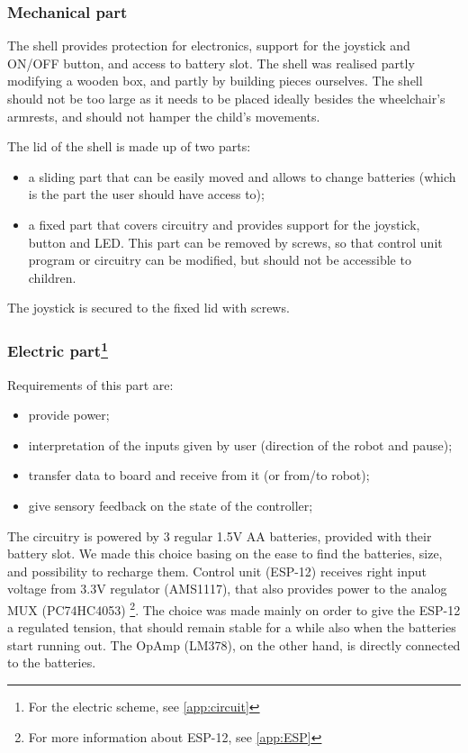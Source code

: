 \documentclass[a4paper,twoside]{book}
\begin{document}
\subsubsection{Mechanical part}

The shell provides protection for electronics, support for the joystick and ON/OFF button, and access to battery slot. The shell was realised partly modifying a wooden box, and partly by building pieces ourselves. The shell should not be too large as it needs to be placed ideally besides the wheelchair's armrests, and should not hamper the child's movements.

\beforelist The lid of the shell is made up of two parts:
\begin{itemize}
\item a sliding part that can be easily moved and allows to change batteries (which is the part the user should have access to);
\item a fixed part that covers circuitry and provides support for the joystick, button and LED. This part can be removed by screws, so that control unit program or circuitry can be modified, but should not be accessible to children.
\end{itemize}
\afterlist
The joystick is secured to the fixed lid with screws.

\subsubsection[Electric part]{Electric part\footnote{For the electric scheme, see \autoref{app:circuit}}}
\beforelist Requirements of this part are: 
\begin{itemize}
\item provide power;
\item interpretation of the inputs given by user (direction of the robot and pause);
\item transfer data to board and receive from it (or from/to robot);
\item give sensory feedback on the state of the controller;
\end{itemize}
\afterlist*
The circuitry is powered by 3 regular 1.5V AA batteries, provided with their battery slot. We made this choice basing on the ease to find the batteries, size, and possibility to recharge them. Control unit (ESP-12) receives right input voltage from 3.3V regulator (AMS1117), that also provides power to the analog MUX (PC74HC4053)%
\footnote{For more information about ESP-12, see \autoref{app:ESP}}.
The choice was made mainly on order to give the ESP-12 a regulated tension, that should remain stable for a while also when the batteries start running out. The OpAmp (LM378), on the other hand, is directly connected to the batteries.
\end{document}
